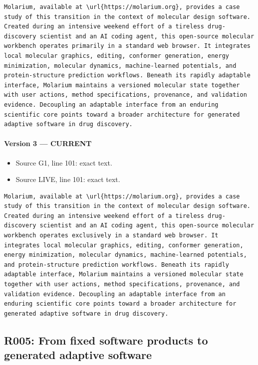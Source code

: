 \documentclass[11pt]{article}
\begin{document}
\begin{lstlisting}
Molarium, available at \url{https://molarium.org}, provides a case study of this transition in the context of molecular design software. Created during an intensive weekend effort of a tireless drug-discovery scientist and an AI coding agent, this open-source molecular workbench operates primarily in a standard web browser. It integrates local molecular graphics, editing, conformer generation, energy minimization, molecular dynamics, machine-learned potentials, and protein-structure prediction workflows. Beneath its rapidly adaptable interface, Molarium maintains a versioned molecular state together with user actions, method specifications, provenance, and validation evidence. Decoupling an adaptable interface from an enduring scientific core points toward a broader architecture for generated adaptive software in drug discovery.
\end{lstlisting}

\paragraph{Version 3 --- CURRENT}

\begin{itemize}[leftmargin=*]
\item Source G1, line 101: exact text.
\item Source LIVE, line 101: exact text.
\end{itemize}

\begin{lstlisting}
Molarium, available at \url{https://molarium.org}, provides a case study of this transition in the context of molecular design software. Created during an intensive weekend effort of a tireless drug-discovery scientist and an AI coding agent, this open-source molecular workbench operates exclusively in a standard web browser. It integrates local molecular graphics, editing, conformer generation, energy minimization, molecular dynamics, machine-learned potentials, and protein-structure prediction workflows. Beneath its rapidly adaptable interface, Molarium maintains a versioned molecular state together with user actions, method specifications, provenance, and validation evidence. Decoupling an adaptable interface from an enduring scientific core points toward a broader architecture for generated adaptive software in drug discovery.
\end{lstlisting}

\subsection{R005: From fixed software products to generated adaptive software}
\end{document}
